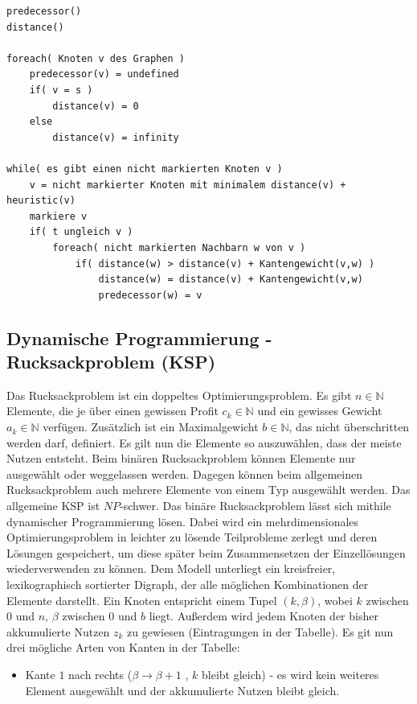 \documentclass[10pt,a4paper,landscape]{article}
\begin{document}
\begin{multicols*}{2}
\begin{verbatim}
predecessor()
distance()

foreach( Knoten v des Graphen )
    predecessor(v) = undefined
    if( v = s )
        distance(v) = 0
    else
        distance(v) = infinity

while( es gibt einen nicht markierten Knoten v )
    v = nicht markierter Knoten mit minimalem distance(v) + heuristic(v)
    markiere v
    if( t ungleich v )
        foreach( nicht markierten Nachbarn w von v )
            if( distance(w) > distance(v) + Kantengewicht(v,w) )
                distance(w) = distance(v) + Kantengewicht(v,w)
                predecessor(w) = v
    \end{verbatim}
\normalsize

    \subsection{ Dynamische Programmierung - Rucksackproblem (KSP) }
    Das Rucksackproblem ist ein doppeltes Optimierungsproblem. Es gibt $n \in \mathbb{N}$ Elemente, 
    die je über einen gewissen Profit $c_k \in \mathbb{N}$ und ein gewisses Gewicht $a_k \in \mathbb{N}$ verfügen. 
    Zusätzlich ist ein Maximalgewicht $b \in \mathbb{N}$, das nicht überschritten werden darf, definiert. 
    Es gilt nun die Elemente so auszuwählen, dass der meiste Nutzen entsteht.
    \newline
    Beim binären Rucksackproblem können Elemente nur ausgewählt oder weggelassen werden. Dagegen können beim allgemeinen Rucksackproblem 
    auch mehrere Elemente von einem Typ ausgewählt werden. Das allgemeine KSP ist $NP$-schwer.
    \newline
    Das binäre Rucksackproblem lässt sich mithile dynamischer Programmierung lösen. Dabei wird ein mehrdimensionales Optimierungsproblem
    in leichter zu lösende Teilprobleme zerlegt und deren Lösungen gespeichert, um diese später beim Zusammensetzen der Einzellösungen 
    wiederverwenden zu können. Dem Modell unterliegt ein kreisfreier, lexikographisch sortierter Digraph, der alle möglichen Kombinationen der Elemente 
    darstellt. Ein Knoten entspricht einem Tupel $(k,\beta)$, wobei $k$ zwischen $0$ und $n$, $\beta$ zwischen $0$ und $b$ liegt. 
    Außerdem wird jedem Knoten der bisher akkumulierte Nutzen $z_k$ zu gewiesen (Eintragungen in der Tabelle).
    \newline
    Es git nun drei mögliche Arten von Kanten in der Tabelle:
    \begin{itemize}
        \item Kante $1$ nach rechts ($\beta \rightarrow \beta + 1$ , $k$ bleibt gleich) - es wird kein weiteres Element ausgewählt und der akkumulierte Nutzen bleibt gleich.

\end{itemize}
\end{multicols*}
\end{document}
